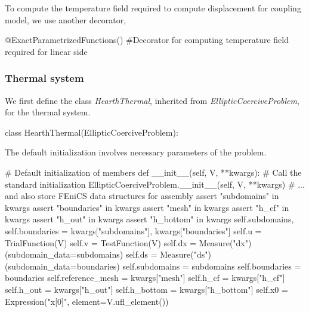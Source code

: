 To compute the temperature field required to compute displacement for coupling model, we use another decorator,
\begin{python}
@ExactParametrizedFunctions() #Decorator for computing temperature field required for linear side
\end{python}

\subsubsection{Thermal system}

We first define the class \emph{HearthThermal}, inherited from \emph{EllipticCoerciveProblem}, for the thermal system.
\begin{python}
class HearthThermal(EllipticCoerciveProblem):
\end{python}

The default initialization involves necessary parameters of the problem.
\begin{python}
	# Default initialization of members
	def __init__(self, V, **kwargs):
		# Call the standard initialization
		EllipticCoerciveProblem.__init__(self, V, **kwargs)
		# ... and also store FEniCS data structures for assembly
		assert "subdomains" in kwargs
		assert "boundaries" in kwargs
		assert "mesh" in kwargs
		assert "h_cf" in kwargs
		assert "h_out" in kwargs
		assert "h_bottom" in kwargs
		self.subdomains, self.boundaries = kwargs["subdomains"], kwargs["boundaries"]
		self.u = TrialFunction(V) 
		self.v = TestFunction(V)
		self.dx = Measure("dx")(subdomain_data=subdomains)
		self.ds = Measure("ds")(subdomain_data=boundaries)
		self.subdomains = subdomains
		self.boundaries = boundaries
		self.reference_mesh = kwargs["mesh"]
		self.h_cf = kwargs["h_cf"]
		self.h_out = kwargs["h_out"]
		self.h_bottom = kwargs["h_bottom"]
		self.x0 = Expression("x[0]", element=V.ufl_element())
\end{python}

